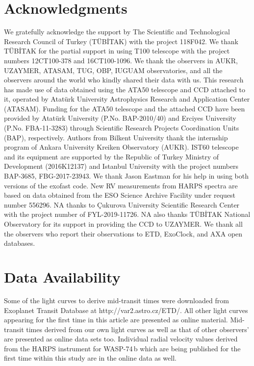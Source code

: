 \documentclass[a4paper,fleqn,usenatbib]{mnras}
\begin{document}
\section*{Acknowledgments}
We gratefully acknowledge the support by The Scientific and Technological Research Council of Turkey (T\"UB\.{I}TAK) with the project 118F042. We thank T\"UB\.{I}TAK for the partial support in using T100 telescope with the project numbers 12CT100-378 and 16CT100-1096. We thank the observers in AUKR, UZAYMER, ATASAM, TUG, OBP, IUGUAM observatories, and all the observers around the world who kindly shared their data with us. This research has made use of data obtained using the ATA50 telescope and CCD attached to it, operated by Atat\"urk University Astrophysics Research and Application Center (ATASAM). Funding for the ATA50 telescope and the attached CCD have been provided by Atat\"urk University (P.No. BAP-2010/40) and Erciyes University (P.No. FBA-11-3283) through Scientific Research Projects Coordination Units (BAP), respectively. Authors from Bilkent University thank the internship program of Ankara University Kreiken Observatory (AUKR). IST60 telescope and its equipment are supported by the Republic of Turkey Ministry of Development (2016K12137) and Istanbul University with the project numbers BAP-3685, FBG-2017-23943. We thank Jason Eastman for his help in using both versions of the {\sc exofast} code. New RV measurements from HARPS spectra are based on data obtained from the ESO Science Archive Facility under request number 556296. NA thanks to \c{C}ukurova University Scientific Research Center with the project number of FYL-2019-11726. NA also thanks T\"UB\.{I}TAK National Observatory for its support in providing the CCD to UZAYMER. We thank all the observers who report their observations to ETD, ExoClock, and AXA open databases.

\section{Data Availability}
Some of the light curves to derive mid-transit times were downloaded from Exoplanet Transit Database at http://var2.astro.cz/ETD/. All other light curves appearing for the first time in this article are presented as online material. Mid-transit times derived from our own light curves as well as that of other observers' are presented as online data sets too. Individual radial velocity values derived from the HARPS instrument for WASP-74\,b which are being published for the first time within this study are in the online data as well.  
\end{document}
